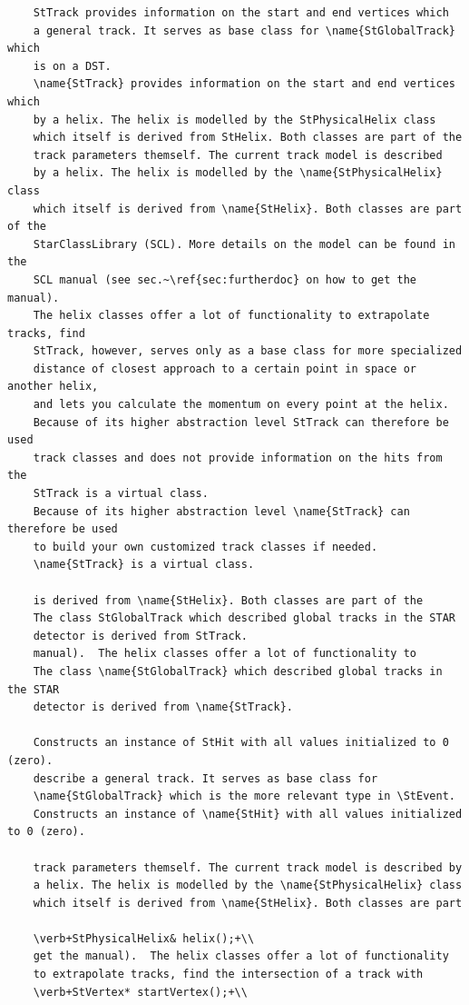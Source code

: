 \begin{Entry}
\begin{Entry}
{\begin{verbatim}
    StTrack provides information on the start and end vertices which
    a general track. It serves as base class for \name{StGlobalTrack} which
    is on a DST.
    \name{StTrack} provides information on the start and end vertices which
    by a helix. The helix is modelled by the StPhysicalHelix class
    which itself is derived from StHelix. Both classes are part of the
    track parameters themself. The current track model is described
    by a helix. The helix is modelled by the \name{StPhysicalHelix} class
    which itself is derived from \name{StHelix}. Both classes are part of the
    StarClassLibrary (SCL). More details on the model can be found in the
    SCL manual (see sec.~\ref{sec:furtherdoc} on how to get the manual).
    The helix classes offer a lot of functionality to extrapolate tracks, find
    StTrack, however, serves only as a base class for more specialized
    distance of closest approach to a certain point in space or another helix,
    and lets you calculate the momentum on every point at the helix.
    Because of its higher abstraction level StTrack can therefore be used
    track classes and does not provide information on the hits from the
    StTrack is a virtual class.
    Because of its higher abstraction level \name{StTrack} can therefore be used
    to build your own customized track classes if needed.
    \name{StTrack} is a virtual class.
    
    is derived from \name{StHelix}. Both classes are part of the
    The class StGlobalTrack which described global tracks in the STAR
    detector is derived from StTrack.
    manual).  The helix classes offer a lot of functionality to
    The class \name{StGlobalTrack} which described global tracks in the STAR
    detector is derived from \name{StTrack}.
    
    Constructs an instance of StHit with all values initialized to 0 (zero).
    describe a general track. It serves as base class for
    \name{StGlobalTrack} which is the more relevant type in \StEvent.
    Constructs an instance of \name{StHit} with all values initialized to 0 (zero).

    track parameters themself. The current track model is described by
    a helix. The helix is modelled by the \name{StPhysicalHelix} class
    which itself is derived from \name{StHelix}. Both classes are part
    
    \verb+StPhysicalHelix& helix();+\\
    get the manual).  The helix classes offer a lot of functionality
    to extrapolate tracks, find the intersection of a track with
    \verb+StVertex* startVertex();+\\
    

\end{verbatim}}
\end{Entry}
\end{Entry}

